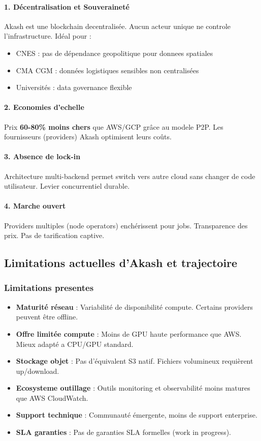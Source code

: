 \documentclass[11pt,a4paper]{article}
\begin{document}
	\paragraph{1. Décentralisation et Souveraineté}
	Akash est une blockchain decentralisée. Aucun acteur unique ne controle l'infrastructure. Idéal pour :
	\begin{itemize}
		\item CNES : pas de dépendance geopolitique pour donnees spatiales
		\item CMA CGM : données logistiques sensibles non centralisées
		\item Universités : data governance flexible
	\end{itemize}
	
	\paragraph{2. Economies d'echelle}
	Prix \textbf{60-80\% moins chers} que AWS/GCP grâce au modele P2P. Les fournisseurs (providers) Akash optimisent leurs coûts.
	
	\paragraph{3. Absence de lock-in}
	Architecture multi-backend permet switch vers autre cloud sans changer de code utilisateur. Levier concurrentiel durable.
	
	\paragraph{4. Marche ouvert}
	Providers multiples (node operators) enchérissent pour jobs. Transparence des prix. Pas de tarification captive.
	
	\subsection{Limitations actuelles d'Akash et trajectoire}
	
	\subsubsection{Limitations presentes}
	
	\begin{itemize}
		\item \textbf{Maturité réseau} : Variabilité de disponibilité compute. Certains providers peuvent être offline.
		\item \textbf{Offre limitée compute} : Moins de GPU haute performance que AWS. Mieux adapté a CPU/GPU standard.
		\item \textbf{Stockage objet} : Pas d'équivalent S3 natif. Fichiers volumineux requièrent up/download.
		\item \textbf{Ecosysteme outillage} : Outils monitoring et observabilité moins matures que AWS CloudWatch.
		\item \textbf{Support technique} : Communauté émergente, moins de support enterprise.
		\item \textbf{SLA garanties} : Pas de garanties SLA formelles (work in progress).
	\end{itemize}
	
\end{document}
